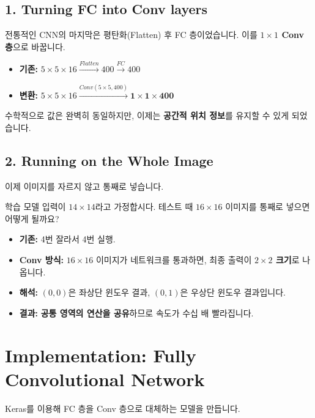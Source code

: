 \documentclass[11pt,a4paper]{book}
\theoremstyle{definition}
\begin{document}
\subsection{1. Turning FC into Conv layers}
전통적인 CNN의 마지막은 평탄화(Flatten) 후 FC 층이었습니다. 이를 \textbf{$1 \times 1$ Conv 층}으로 바꿉니다.

\begin{itemize}
    \item \textbf{기존:} $5 \times 5 \times 16 \xrightarrow{Flatten} 400 \xrightarrow{FC} 400$
    \item \textbf{변환:} $5 \times 5 \times 16 \xrightarrow{Conv(5\times5, 400)} \mathbf{1 \times 1 \times 400}$
\end{itemize}
수학적으로 값은 완벽히 동일하지만, 이제는 \textbf{공간적 위치 정보}를 유지할 수 있게 되었습니다.

\subsection{2. Running on the Whole Image}
이제 이미지를 자르지 않고 통째로 넣습니다.

\begin{mathbox}[title={연산 공유의 마법}]
학습 모델 입력이 $14 \times 14$라고 가정합시다.
테스트 때 $16 \times 16$ 이미지를 통째로 넣으면 어떻게 될까요?

\begin{itemize}
    \item \textbf{기존:} 4번 잘라서 4번 실행.
    \item \textbf{Conv 방식:} $16 \times 16$ 이미지가 네트워크를 통과하면, 최종 출력이 \textbf{$2 \times 2$ 크기}로 나옵니다.
    \item \textbf{해석:} $(0,0)$은 좌상단 윈도우 결과, $(0,1)$은 우상단 윈도우 결과입니다.
    \item \textbf{결과:} \textbf{공통 영역의 연산을 공유}하므로 속도가 수십 배 빨라집니다.
\end{itemize}
\end{mathbox}

\section{Implementation: Fully Convolutional Network}

Keras를 이용해 FC 층을 Conv 층으로 대체하는 모델을 만듭니다.
\end{document}
